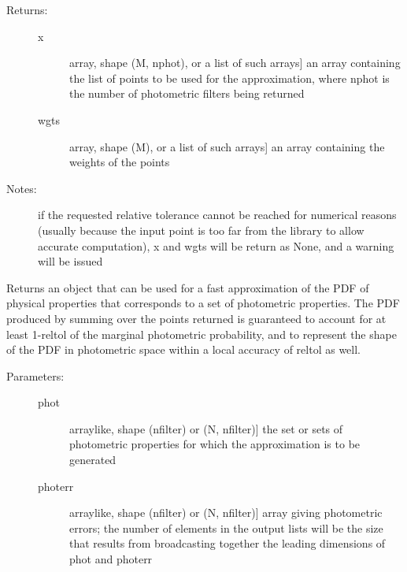 \documentclass[letterpaper,10pt,english]{sphinxmanual}
\begin{document}
\begin{fulllineitems}
\begin{fulllineitems}
\begin{description}
\item[{Returns:}] \leavevmode\begin{description}
\item[{x}] \leavevmode{[}array, shape (M, nphot), or a list of such arrays{]}
an array containing the list of points to be used for
the approximation, where nphot is the number of
photometric filters being returned

\item[{wgts}] \leavevmode{[}array, shape (M), or a list of such arrays{]}
an array containing the weights of the points

\end{description}

\item[{Notes:}] \leavevmode
if the requested relative tolerance cannot be reached for
numerical reasons (usually because the input point is too
far from the library to allow accurate computation), x and
wgts will be return as None, and a warning will be issued

\end{description}

\end{fulllineitems}


\begin{fulllineitems}
\label{bayesphot:slugpy.bayesphot.bp.bp.make_approx_phys}
Returns an object that can be used for a fast approximation of
the PDF of physical properties that corresponds to a set of
photometric properties. The PDF produced by summing over the
points returned is guaranteed to account for at least 1-reltol
of the marginal photometric probability, and to represent the
shape of the PDF in photometric space within a local accuracy
of reltol as well.
\begin{description}
\item[{Parameters:}] \leavevmode\begin{description}
\item[{phot}] \leavevmode{[}arraylike, shape (nfilter) or (N, nfilter){]}
the set or sets of photometric properties for which the
approximation is to be generated

\item[{photerr}] \leavevmode{[}arraylike, shape (nfilter) or (N, nfilter){]}
array giving photometric errors; the number of elements
in the output lists will be the size that results from
broadcasting together the leading dimensions of phot and
photerr


\end{description}
\end{description}
\end{fulllineitems}
\end{fulllineitems}
\end{document}
